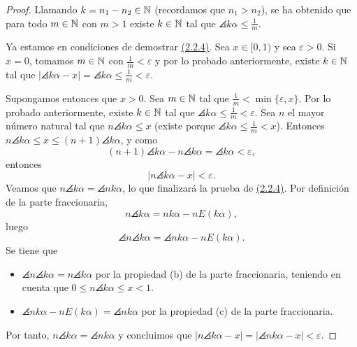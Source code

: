 \documentclass[a4paper, 12pt, oneside]{book}
\begin{document}
\begin{proof}
    Llamando $k = n_1-n_2 \in \mathbb N$ (recordamos que $n_1>n_2$), se ha obtenido que para todo $m \in \mathbb N$ con $m>1$ existe $k \in \mathbb N$ tal que $\angles{k\alpha} \leq \frac{1}{m}$.
    
    Ya estamos en condiciones de demostrar \hyperref[2.2.4]{\color{blue}(2.2.4)}. Sea $x \in [0,1)$ y sea $\varepsilon > 0$. Si $x = 0$, tomamos $m \in \mathbb N$ con $\frac{1}{m}<\varepsilon$ y por lo probado anteriormente, existe $k \in \mathbb N$ tal que $|\angles{k\alpha}-x| = \angles{k\alpha}  \leq \frac{1}{m}< \varepsilon$.
    
    Supongamos entonces que $x > 0$. Sea $m \in \mathbb N$ tal que $\frac{1}{m} < \min\{\varepsilon,x\}$. Por lo probado anteriormente, existe $k \in \mathbb N$ tal que $\angles{k\alpha} \leq \frac{1}{m}< \varepsilon$.
    Sea $n$ el mayor número natural tal que $n \angles{k\alpha} \leq x$ (existe porque $\angles{k\alpha} \leq \frac{1}{m} < x$). Entonces $n \angles{k\alpha} \leq x \leq (n+1)\angles{k\alpha}$, y como
    \[(n+1)\angles{k\alpha} - n\angles{k\alpha} = \angles{k\alpha} < \varepsilon,\]
    entonces
    \[|n\angles{k\alpha}-x| < \varepsilon.\]
    Veamos que $n\angles{k\alpha} = \angles{nk\alpha}$, lo que finalizará la prueba de \hyperref[2.2.4]{\color{blue}(2.2.4)}. Por definición de la parte fraccionaria,
    \[n\angles{k\alpha} = nk\alpha-nE( k\alpha ),\]
    luego 
    \[\angles{n\angles{k\alpha}} = \angles{nk\alpha-nE( k\alpha)}.\]
    Se tiene que
    \begin{itemize}
        \item $\angles{n\angles{k\alpha}} = n\angles{k\alpha}$ por la propiedad (b) de la parte fraccionaria, teniendo en cuenta que $0 \leq n\angles{k\alpha} \leq x < 1$.
        \item $\angles{nk\alpha-nE( k\alpha )} = \angles{nk\alpha}$ por la propiedad (c) de la parte fraccionaria.
    \end{itemize}
    Por tanto, $n\angles{k\alpha} = \angles{nk\alpha}$ y concluimos que $|n\angles{k\alpha}-x| = |\angles{nk\alpha}-x|<\varepsilon$.
\end{proof}
\end{document}
